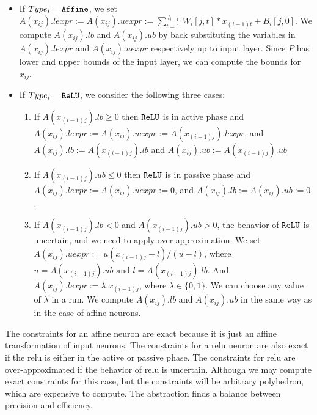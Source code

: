 \begin{itemize}
\item If $Type_i= \mathtt{Affine}$, we set 
  $A(x_{ij}).lexpr := A(x_{ij}).uexpr := \sum_{t=1}^{|l_{i-1}|} W_i[j,t]*x_{(i-1)t} + B_i[j,0]$.
  We compute $A(x_{ij}).lb$ and $A(x_{ij}).ub$ by back substituting
  the variables in $A(x_{ij}).lexpr$ and $A(x_{ij}).uexpr$ respectively up to input layer.
  Since $P$ has lower and upper bounds of the input layer, we can compute
  the bounds for $x_{ij}$.
  
\item If $Type_i= \mathtt{ReLU}$, we consider the following three cases:
  \begin{enumerate}
  \item If $A(x_{(i-1)j}).lb \geq 0$ then $\mathtt{ReLU}$ is in active phase and
    $A(x_{ij}).lexpr := A(x_{ij}).uexpr := A(x_{(i-1)j}).lexpr $,
    and $A(x_{ij}).lb := A(x_{(i-1)j}).lb$ and $A(x_{ij}).ub := A(x_{(i-1)j}).ub$
  \item If $A(x_{(i-1)j}).ub \leq 0$ then $\mathtt{ReLU}$ is in passive phase and
    $A(x_{ij}).lexpr := A(x_{ij}).uexpr := 0$, 
    and $A(x_{ij}).lb := A(x_{ij}).ub := 0$.
  \item  If $A(x_{(i-1)j}).lb < 0$ and $A(x_{(i-1)j}).ub > 0$,
    the behavior of $\mathtt{ReLU}$ is uncertain, and we need to apply
    over-approximation. We set $A(x_{ij}).uexpr := u(x_{(i-1)j} - l) / (u - l)$, 
    where $u = A(x_{(i-1)j}).ub \text{ and } l = A(x_{(i-1)j}).lb$.
    And $A(x_{ij}).lexpr := \lambda . x_{(i-1)j}$, where $\lambda \in \{0,1\}$. 
    We can choose any value of $\lambda$ in a run.
    We compute $A(x_{ij}).lb$ and $A(x_{ij}).ub$ in the same way as
    in the case of affine neurons.
  \end{enumerate} 
\end{itemize}

The constraints for an affine neuron are exact because it is just an affine
transformation of input neurons. 
The constraints for a relu neuron are also exact if the relu is either
in the active or passive phase. 
The constraints for relu are over-approximated if the behavior of relu
is uncertain. Although we may compute exact 
constraints for this case, but the constraints will be arbitrary polyhedron,
which are expensive to compute.
The \deepoly abstraction finds a balance between precision and efficiency.

